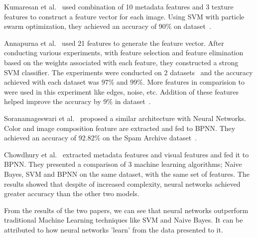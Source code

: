 \par Kumaresan et al.~\cite{9} used combination of 10 metadata features and 3 texture features to construct a feature vector for each image. Using SVM with particle swarm optimization, they achieved an accuracy of 90\% on dataset~\cite{10}.
\par Annapurna et al.~\cite{7} used 21 features to generate the feature vector. After conducting various experiments, with feature selection and feature elimination based on the weights associated with each feature, they constructed a strong SVM classifier. The experiments were conducted on 2 datasets~\cite{3, 10} and the accuracy achieved with each dataset was 97\% and 99\%. More features in comparision to~\cite{9} were used in this experiment like edges, noise, etc. Addition of these features helped improve the accuracy by 9\% in dataset~\cite{10}.
\par Soranamageswari et al.~\cite{12} proposed a similar architecture with Neural Networks. Color and image composition feature are extracted and fed to BPNN. They achieved an accuracy of 92.82\% on the Spam Archive dataset~\cite{13}.

\par Chowdhury et al.~\cite{14} extracted metadata features and visual features and fed it to BPNN. They presented a comparison of 3 machine learning algorithms; Naive Bayes, SVM and BPNN on the same dataset, with the same set of features. The results showed that despite of increased complexity, neural networks achieved greater accuracy than the other two models.

\par From the results of the two papers, we can see that neural networks outperform traditional Machine Learning techniques like SVM and Naive Bayes. It can be attributed to how neural networks 'learn' from the data presented to it. 


